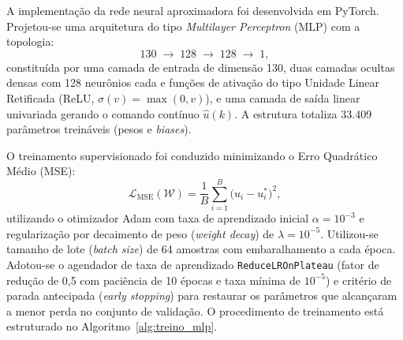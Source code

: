 A implementação da rede neural aproximadora foi desenvolvida em PyTorch. Projetou-se uma arquitetura do tipo \textit{Multilayer Perceptron} (MLP) com a topologia:
\begin{equation}
    130 \;\longrightarrow\; 128 \;\longrightarrow\; 128 \;\longrightarrow\; 1,
    \label{eq:topologia_mlp}
\end{equation}
\noindent constituída por uma camada de entrada de dimensão 130, duas camadas ocultas densas com 128 neurônios cada e funções de ativação do tipo Unidade Linear Retificada (ReLU, $\sigma(v) = \max(0, v)$), e uma camada de saída linear univariada gerando o comando contínuo $\hat{u}(k)$. A estrutura totaliza 33.409 parâmetros treináveis (pesos e \textit{biases}).

O treinamento supervisionado foi conduzido minimizando o Erro Quadrático Médio (MSE):
\begin{equation}
    \mathcal{L}_{\text{MSE}}(\mathcal{W}) = \frac{1}{B} \sum_{i=1}^{B} \bigl( \hat{u}_i - u_i^* \bigr)^2,
    \label{eq:mse_loss}
\end{equation}
\noindent utilizando o otimizador Adam com taxa de aprendizado inicial $\alpha = 10^{-3}$ e regularização por decaimento de peso (\textit{weight decay}) de $\lambda = 10^{-5}$. Utilizou-se tamanho de lote (\textit{batch size}) de 64 amostras com embaralhamento a cada época. Adotou-se o agendador de taxa de aprendizado \texttt{ReduceLROnPlateau} (fator de redução de 0,5 com paciência de 10 épocas e taxa mínima de $10^{-5}$) e critério de parada antecipada (\textit{early stopping}) para restaurar os parâmetros que alcançaram a menor perda no conjunto de validação. O procedimento de treinamento está estruturado no Algoritmo~\ref{alg:treino_mlp}.


